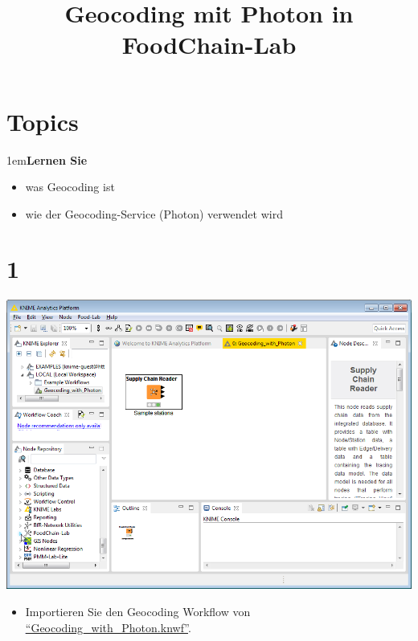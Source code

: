 \documentclass[10pt]{beamer}
\title{Geocoding mit Photon in FoodChain-Lab}
\date{}
\begin{document}
\maketitle

\section{Topics}
\begin{frame}
\leftskip1em\textbf{Lernen Sie}
	\begin{itemize}
    \item was Geocoding ist
    \item wie der Geocoding-Service (Photon) verwendet wird
	\end{itemize}
\end{frame}
 
\section{1}
\begin{frame}
	\begin{center}
  		\includegraphics[height=0.6\textheight]{1.png}
	\end{center}
	\begin{itemize}
		\item Importieren Sie den Geocoding Workflow von  \textcolor{blue}{\underline{\href{https://github.com/SiLeBAT/BfROpenLabResources/raw/master/GitHubPages/workflows/Geocoding\_with\_Photon.knwf}{``Geocoding\_with\_Photon.knwf''}}}.
	\end{itemize}
\end{frame}
\end{document}
